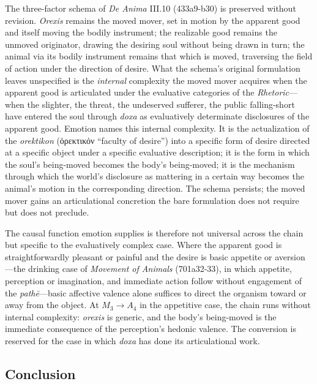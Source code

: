 \documentclass{article}
\newcommand{\gk}[1]{{\greekfont #1}}
\begin{document}
The three-factor schema of \textit{De Anima} III.10 (433a9-b30) is preserved without revision. \textit{Orexis} remains the moved mover, set in motion by the apparent good and itself moving the bodily instrument; the realizable good remains the unmoved originator, drawing the desiring soul without being drawn in turn; the animal via its bodily instrument remains that which is moved, traversing the field of action under the direction of desire. What the schema's original formulation leaves unspecified is the \textit{internal} complexity the moved mover acquires when the apparent good is articulated under the evaluative categories of the \textit{Rhetoric}---when the slighter, the threat, the undeserved sufferer, the public falling-short have entered the soul through \textit{doxa} as evaluatively determinate disclosures of the apparent good. Emotion names this internal complexity. It is the actualization of the \textit{orektikon} (\gk{ὀρεκτικόν} ``faculty of desire'') into a specific form of desire directed at a specific object under a specific evaluative description; it is the form in which the soul's being-moved becomes the body's being-moved; it is the mechanism through which the world's disclosure as mattering in a certain way becomes the animal's motion in the corresponding direction. The schema persists; the moved mover gains an articulational concretion the bare formulation does not require but does not preclude.

The causal function emotion supplies is therefore not universal across the chain but specific to the evaluatively complex case. Where the apparent good is straightforwardly pleasant or painful and the desire is basic appetite or aversion---the drinking case of \textit{Movement of Animals} (701a32-33), in which appetite, perception or imagination, and immediate action follow without engagement of the \textit{pathē}---basic affective valence alone suffices to direct the organism toward or away from the object. At $M_3 \rightarrow A_4$ in the appetitive case, the chain runs without internal complexity: \textit{orexis} is generic, and the body's being-moved is the immediate consequence of the perception's hedonic valence. The conversion is reserved for the case in which \textit{doxa} has done its articulational work. 

\subsection{Conclusion}
\end{document}
